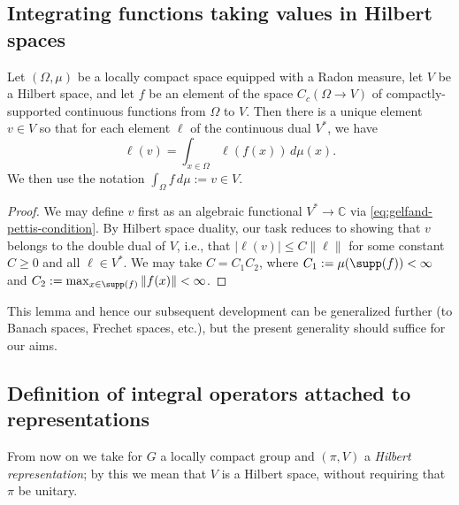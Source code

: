 \documentclass[reqno]{amsart} 
\begin{document}
\subsection{Integrating functions taking values in Hilbert spaces}\label{sec:cnh2vor8cp}
\begin{lemma}
  Let $(\Omega,\mu)$ be a locally compact space equipped with a Radon measure, let $V$ be a Hilbert space, and let $f$ be an element of the space $C_c(\Omega \rightarrow V)$ of compactly-supported continuous functions from $\Omega$ to $V$.  Then there is a unique element $v \in V$ so that for each element $\ell$ of the continuous dual $V^*$, we have
  \begin{equation}\label{eq:gelfand-pettis-condition}
    \ell(v) = \int_{x \in \Omega} \ell(f(x)) \, d \mu(x).
  \end{equation}
  We then use the notation $\int_\Omega f \, d \mu := v \in V$.
\end{lemma}
\begin{proof}
  We may define $v$ first as an algebraic functional $V^* \rightarrow \mathbb{C}$ via \eqref{eq:gelfand-pettis-condition}.  By Hilbert space duality, our task reduces to showing that $v$ belongs to the double dual of $V$, i.e., that $|\ell(v)| \leq C \|\ell\|$ for some constant $C \geq 0$ and all $\ell \in V^*$.  We may take $C = C_1 C_2$, where $C_1 := \mu(\supp(f)) < \infty$ and $C_2 := \max_{x \in \supp(f)} \|f(x)\| < \infty$.
\end{proof}

This lemma and hence our subsequent development can be generalized further (to Banach spaces, Frechet spaces, etc.), but the present generality should suffice for our aims.

\subsection{Definition of integral operators attached to representations}\label{sec:cnh2vosfin}
From now on we take for $G$ a locally compact group and $(\pi,V)$ a \emph{Hilbert representation}; by this we mean that $V$ is a Hilbert space, without requiring that $\pi$ be unitary.
\end{document}
